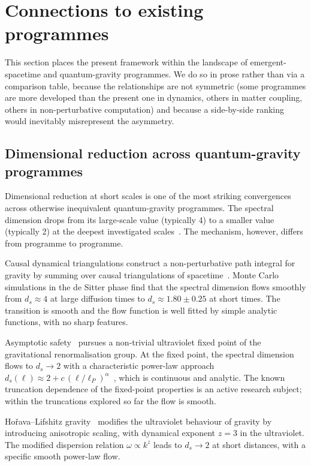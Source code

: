 ﻿\documentclass[12pt,a4paper]{article}
\theoremstyle{definition}
\begin{document}
\section{Connections to existing programmes}
\label{sec:connections}

This section places the present framework within the landscape of emergent-spacetime and quantum-gravity programmes. We do so in prose rather than via a comparison table, because the relationships are not symmetric (some programmes are more developed than the present one in dynamics, others in matter coupling, others in non-perturbative computation) and because a side-by-side ranking would inevitably misrepresent the asymmetry.

\subsection{Dimensional reduction across quantum-gravity programmes}
\label{sec:conn_dim_reduction}

Dimensional reduction at short scales is one of the most striking convergences across otherwise inequivalent quantum-gravity programmes. The spectral dimension drops from its large-scale value (typically 4) to a smaller value (typically 2) at the deepest investigated scales~\citep{carlip}. The mechanism, however, differs from programme to programme.

Causal dynamical triangulations construct a non-perturbative path integral for gravity by summing over causal triangulations of spacetime~\citep{cdt,ambjorn2}. Monte Carlo simulations in the de Sitter phase find that the spectral dimension flows smoothly from $d_s \approx 4$ at large diffusion times to $d_s \approx 1.80 \pm 0.25$ at short times. The transition is smooth and the flow function is well fitted by simple analytic functions, with no sharp features.

Asymptotic safety~\citep{reuter,niedermaier,percacci} pursues a non-trivial ultraviolet fixed point of the gravitational renormalisation group. At the fixed point, the spectral dimension flows to $d_s \to 2$ with a characteristic power-law approach $d_s(\ell) \approx 2 + c\,(\ell/\ell_P)^\alpha$~\citep{lauscher,rechenberger}, which is continuous and analytic. The known truncation dependence of the fixed-point properties is an active research subject; within the truncations explored so far the flow is smooth.

Ho\v{r}ava--Lifshitz gravity~\citep{horava,horava2} modifies the ultraviolet behaviour of gravity by introducing anisotropic scaling, with dynamical exponent $z = 3$ in the ultraviolet. The modified dispersion relation $\omega \propto k^z$ leads to $d_s \to 2$ at short distances, with a specific smooth power-law flow.
\end{document}
